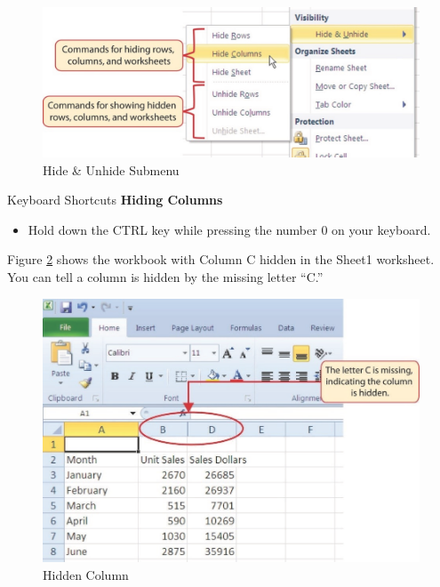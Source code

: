 \begin{figure}[H]
	\centering
	\includegraphics[width=\maxwidth{.95\linewidth}]{gfx/ch01_fig26}
	\caption{Hide \& Unhide Submenu}
	\label{01:fig26}
\end{figure}

\begin{center}
	\begin{shtcutbox}{Keyboard Shortcuts}
		\textbf{Hiding Columns}
		\\
		\begin{itemize}
			\setlength{\itemsep}{0pt}
			\setlength{\parskip}{0pt}
			\setlength{\parsep}{0pt}
			
			\item Hold down the CTRL key while pressing the number 0 on your keyboard.
			
		\end{itemize}
	\end{shtcutbox}
\end{center}

Figure \ref{01:fig27} shows the workbook with Column \textsf{C} hidden in the Sheet1 worksheet. You can tell a column is hidden by the missing letter ``C.''

\begin{figure}[H]
	\centering
	\includegraphics[width=\maxwidth{.95\linewidth}]{gfx/ch01_fig27}
	\caption{Hidden Column}
	\label{01:fig27}
\end{figure}

